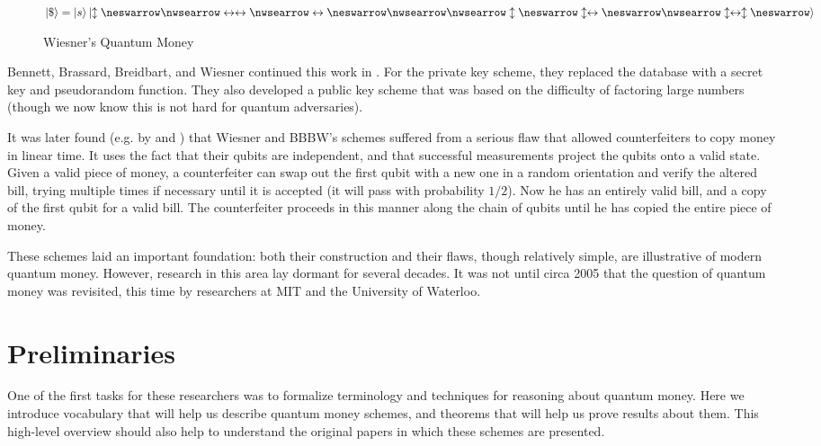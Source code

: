\documentclass[12pt]{article}
\begin{document}
\begin{figure}[h!]
\caption{Wiesner's Quantum Money}
\Large \centering
$\Ket{\$} = \Ket{s}\Ket{\updownarrow \neswarrow \nwsearrow \leftrightarrow \leftrightarrow \nwsearrow \leftrightarrow \neswarrow \nwsearrow \nwsearrow \updownarrow \neswarrow \updownarrow \leftrightarrow \neswarrow \nwsearrow \updownarrow \leftrightarrow \updownarrow \neswarrow}$
\end{figure}

Bennett, Brassard, Breidbart, and Wiesner continued this work in \cite{BBBW83}.  For the private key scheme, they replaced the database with a secret key and pseudorandom function.  They also developed a public key scheme that was based on the difficulty of factoring large numbers (though we now know this is not hard for quantum adversaries).

It was later found (e.g. by \cite{Aar12} and \cite{Lut10}) that Wiesner and BBBW's schemes suffered from a serious flaw that allowed counterfeiters to copy money in linear time.  It uses the fact that their qubits are independent, and that successful measurements project the qubits onto a valid state.  Given a valid piece of money, a counterfeiter can swap out the first qubit with a new one in a random orientation and verify the altered bill, trying multiple times if necessary until it is accepted (it will pass with probability $1/2$).  Now he has an entirely valid bill, and a copy of the first qubit for a valid bill.  The counterfeiter proceeds in this manner along the chain of qubits until he has copied the entire piece of money.

These schemes laid an important foundation: both their construction and their flaws, though relatively simple, are illustrative of modern quantum money.  However, research in this area lay dormant for several decades.  It was not until circa 2005 that the question of quantum money was revisited, this time by researchers at MIT and the University of Waterloo.



\section{Preliminaries}
One of the first tasks for these researchers was to formalize terminology and techniques for reasoning about quantum money.  Here we introduce vocabulary that will help us describe quantum money schemes, and theorems that will help us prove results about them.  This high-level overview should also help to understand the original papers in which these schemes are presented.
\end{document}
